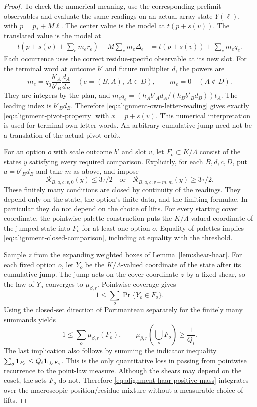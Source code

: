 \begin{proof}
To check the numerical meaning, use the corresponding prelimit
observables and evaluate the same readings on an actual array state
$Y(\ell)$, with $p=p_*+M\ell$.  The center value is the
model at $t(p+s(v))$.  The translated value is the model at
\begin{align}
 t\left(p+s(v)+\sum_e m_er_e\right)
       +M\sum_e m_e\Delta_e
 &=t(p+s(v))+\sum_e m_eq_e.
       \label{eq:alignment-own-letter-reading}
\end{align}
Each occurrence uses the correct residue-specific observable at
its new slot.  For the terminal word at outcome $b'$ and future
multiplier $d$, the powers are
\[
 m_e=q_0\frac{b'_A}{b'_B}\frac{d_A}{d_B}\quad(e=(B,A),\ A\in D),
 \qquad m_e=0\quad(A\notin D).
\]
They are integers by the plan, and
$m_eq_e=(h_A b'_A d_A/(h_B b'_B d_B))t_A$.
The leading index is $b'_Bd_B$.  Therefore
\eqref{eq:alignment-own-letter-reading} gives exactly
\eqref{eq:alignment-pivot-property} with $x=p+s(v)$.
This numerical interpretation is used for terminal own-letter
words.  An arbitrary cumulative jump need not be a translation
of the actual pivot orbit.

For an option $o$ with scale outcome $b'$ and slot $v$, let
$F_o\subset K/\Lambda$ consist of the states $y$ satisfying every
required comparison.  Explicitly, for each $B,d,c,D$, put
$a=b'_Bd_B$ and take $m$ as above, and impose
\begin{equation}\label{eq:alignment-closed-comparison}
 \mathcal R_{B,a,c;v,0}(y)\le3\tau/2\quad\text{or}\quad
 \mathcal R_{B,a,c;v+m,m}(y)\ge3\tau/2.
\end{equation}
These finitely many conditions are closed by continuity of the
readings.  They depend only on the state,
the option's finite data, and the limiting formulae.  In
particular they do not depend on the choice of lifts.
For every starting cover coordinate, the pointwise palette
construction puts the $K/\Lambda$-valued coordinate of the jumped
state into $F_o$ for at least one option $o$. Equality of palettes implies
\eqref{eq:alignment-closed-comparison}, including at equality
with the threshold.

Sample $z$ from the expanding weighted boxes of
Lemma~\ref{lem:shear-haar}. For each fixed option $o$, let $Y_o$ be the
$K/\Lambda$-valued coordinate of the state after its cumulative jump.
The jump acts on the cover coordinate $z$ by a fixed shear, so the law
of $Y_o$ converges to $\mu_{\beta,r}$. Pointwise coverage gives
\[
 1\le\sum_o\Pr\{Y_o\in F_o\}.
\]
Using the closed-set direction of Portmanteau separately for the
finitely many summands yields
\begin{equation}\label{eq:alignment-haar-positive-mass}
 1\le\sum_o\mu_{\beta,r}(F_o),\qquad
 \mu_{\beta,r}\left(\bigcup_o F_o\right)\ge\frac1{Q_i}.
\end{equation}
The last implication also follows by summing the indicator
inequality $\sum_o\mathbf 1_{F_o}\le Q_i\mathbf 1_{\cup_oF_o}$.
This is the only quantitative loss in passing from pointwise
recurrence to the point-law measure.  Although the shears may
depend on the coset, the sets $F_o$ do not.  Therefore
\eqref{eq:alignment-haar-positive-mass} integrates over the
macroscopic-position/residue mixture without a measurable choice
of lifts.


\end{proof}
